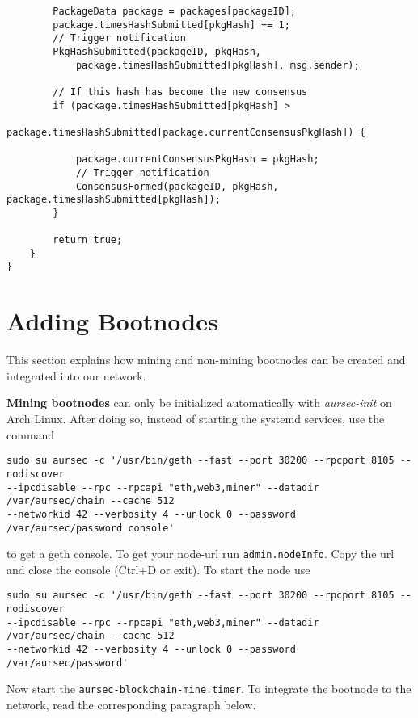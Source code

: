 \begin{verbatim}
        PackageData package = packages[packageID];
        package.timesHashSubmitted[pkgHash] += 1;
        // Trigger notification
        PkgHashSubmitted(packageID, pkgHash,
            package.timesHashSubmitted[pkgHash], msg.sender);

        // If this hash has become the new consensus
        if (package.timesHashSubmitted[pkgHash] >
            package.timesHashSubmitted[package.currentConsensusPkgHash]) {

            package.currentConsensusPkgHash = pkgHash;
            // Trigger notification
            ConsensusFormed(packageID, pkgHash, package.timesHashSubmitted[pkgHash]);
        }

        return true;
    }
}
\end{verbatim}

\newpage
\section{Adding Bootnodes}\label{sec:init-boot}
This section explains how mining and non-mining bootnodes can be created and integrated into our network.\newline

\textbf{Mining bootnodes} can only be initialized automatically with \emph{aursec-init} on Arch Linux.
After doing so, instead of starting the systemd services, use the command
\begin{verbatim}
sudo su aursec -c '/usr/bin/geth --fast --port 30200 --rpcport 8105 --nodiscover
--ipcdisable --rpc --rpcapi "eth,web3,miner" --datadir /var/aursec/chain --cache 512
--networkid 42 --verbosity 4 --unlock 0 --password /var/aursec/password console'
\end{verbatim}

to get a geth console. To get your node-url run \texttt{admin.nodeInfo}. Copy the url and close the console (Ctrl+D or exit). To start the node use

\begin{verbatim}
sudo su aursec -c '/usr/bin/geth --fast --port 30200 --rpcport 8105 --nodiscover
--ipcdisable --rpc --rpcapi "eth,web3,miner" --datadir /var/aursec/chain --cache 512
--networkid 42 --verbosity 4 --unlock 0 --password /var/aursec/password'
\end{verbatim}

Now start the \texttt{aursec-blockchain-mine.timer}.
To integrate the bootnode to the network, read the corresponding paragraph below.\linebreak

